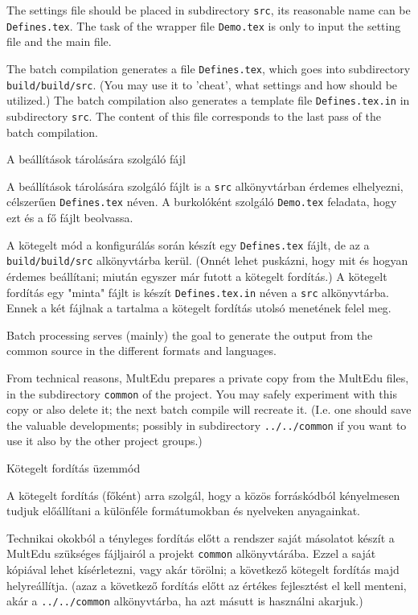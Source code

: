 {
The settings file should be placed in subdirectory \lstinline|src|, its reasonable name can be
\lstinline|Defines.tex|. The task of the wrapper file \lstinline|Demo.tex| is only to input
the setting file and the main file.

The batch compilation generates a file \lstinline|Defines.tex|, which goes into subdirectory
\lstinline|build/build/src|. (You may use it to 'cheat', what settings and how should be utilized.)
The batch compilation also generates a template file \lstinline|Defines.tex.in| in subdirectory \lstinline|src|.
The content of this file corresponds to the last pass of the batch compilation.
}
{A beállítások tárolására szolgáló fájl}
{
A beállítások tárolására szolgáló fájlt is a \lstinline|src| alkönyvtárban érdemes elhelyezni,
célszerűen \lstinline|Defines.tex| néven. A burkolóként szolgáló \lstinline|Demo.tex| feladata, hogy
ezt és a fő fájlt beolvassa.

A kötegelt mód a konfigurálás során készít egy \lstinline|Defines.tex| fájlt, de az a \lstinline|build/build/src|
alkönyvtárba kerül. (Onnét lehet puskázni, hogy mit és hogyan érdemes beállítani; miután egyszer már futott
a kötegelt fordítás.) A kötegelt fordítás egy "minta" fájlt is készít \lstinline|Defines.tex.in| néven a
\lstinline|src| alkönyvtárba. Ennek a két fájlnak a tartalma a kötegelt fordítás utolsó menetének felel meg.
}


{
Batch processing serves (mainly) the goal to generate the output
from the common source in the different formats and languages.

From technical reasons, MultEdu prepares a private copy from
the MultEdu files, in the subdirectory \lstinline|common|  of the project.
You may safely experiment with this copy or also delete it; the next
batch compile will recreate it. (I.e. one should save the valuable developments; possibly in subdirectory \lstinline|../../common|
if you want to use it also by the other project groups.)
}
{Kötegelt fordítás üzemmód}
{
A kötegelt fordítás (főként) arra szolgál, hogy a közös forráskódból kényelmesen tudjuk
előállítani a különféle formátumokban és nyelveken anyagainkat.

Technikai okokból a tényleges fordítás előtt a rendszer saját másolatot
készít a MultEdu szükséges fájljairól a projekt \lstinline|common| alkönyvtárába.
Ezzel a saját kópiával lehet kísérletezni, vagy akár törölni;
a következő kötegelt fordítás majd helyreállítja. (azaz a következő fordítás előtt az értékes fejlesztést el kell menteni, akár a \lstinline|../../common| alkönyvtárba, ha azt másutt is használni akarjuk.)
}

